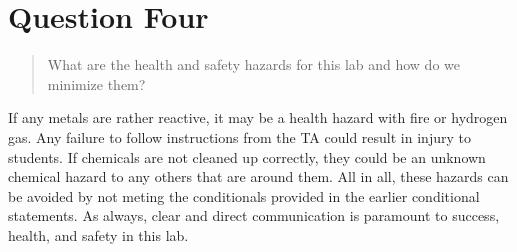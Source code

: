 \documentclass[11pt, letterpaper]{article}
\begin{document}
\section{Question Four}
\begin{quote}
    What are the health and safety hazards for this lab and how do we minimize them?
\end{quote}

If any metals are rather reactive, it may be a health hazard with fire or hydrogen gas.
Any failure to follow instructions from the TA could result in injury to students.
If chemicals are not cleaned up correctly, they could be an unknown chemical hazard to 
any others that are around them.
All in all, these hazards can be avoided by not meting the conditionals provided in the
earlier conditional statements.
As always, clear and direct communication is paramount to success, health, and safety 
in this lab.
\end{document}
